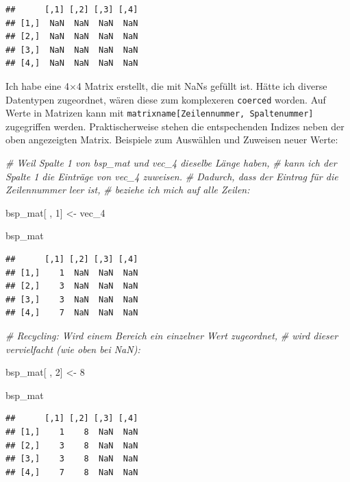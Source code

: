 \documentclass[
  ngerman,
]{book}
\newenvironment{Shaded}{\begin{snugshade}}{\end{snugshade}}
\newcommand{\CommentTok}[1]{\textcolor[rgb]{0.56,0.35,0.01}{\textit{#1}}}
\newcommand{\DecValTok}[1]{\textcolor[rgb]{0.00,0.00,0.81}{#1}}
\newcommand{\NormalTok}[1]{#1}
\newcommand{\OtherTok}[1]{\textcolor[rgb]{0.56,0.35,0.01}{#1}}
\begin{document}
\begin{verbatim}
##      [,1] [,2] [,3] [,4]
## [1,]  NaN  NaN  NaN  NaN
## [2,]  NaN  NaN  NaN  NaN
## [3,]  NaN  NaN  NaN  NaN
## [4,]  NaN  NaN  NaN  NaN
\end{verbatim}

Ich habe eine 4×4 Matrix erstellt, die mit NaNs gefüllt ist. Hätte ich diverse Datentypen zugeordnet, wären diese zum komplexeren \texttt{coerced} worden. Auf Werte in Matrizen kann mit \texttt{matrixname{[}Zeilennummer,\ Spaltenummer{]}} zugegriffen werden. Praktischerweise stehen die entspechenden Indizes neben der oben angezeigten Matrix. Beispiele zum Auswählen und Zuweisen neuer Werte:

\begin{Shaded}
\begin{Highlighting}[]
\CommentTok{\# Weil Spalte 1 von bsp\_mat und vec\_4 dieselbe Länge haben,}
\CommentTok{\# kann ich der Spalte 1 die Einträge von vec\_4 zuweisen.}
\CommentTok{\# Dadurch, dass der Eintrag für die Zeilennummer leer ist, }
\CommentTok{\# beziehe ich mich auf alle Zeilen:}

\NormalTok{bsp\_mat[ , }\DecValTok{1}\NormalTok{] }\OtherTok{\textless{}{-}}\NormalTok{ vec\_4}

\NormalTok{bsp\_mat}
\end{Highlighting}
\end{Shaded}

\begin{verbatim}
##      [,1] [,2] [,3] [,4]
## [1,]    1  NaN  NaN  NaN
## [2,]    3  NaN  NaN  NaN
## [3,]    3  NaN  NaN  NaN
## [4,]    7  NaN  NaN  NaN
\end{verbatim}

\begin{Shaded}
\begin{Highlighting}[]
\CommentTok{\# Recycling: Wird einem Bereich ein einzelner Wert zugeordnet,}
\CommentTok{\# wird dieser vervielfacht (wie oben bei NaN):}

\NormalTok{bsp\_mat[ , }\DecValTok{2}\NormalTok{] }\OtherTok{\textless{}{-}} \DecValTok{8}

\NormalTok{bsp\_mat}
\end{Highlighting}
\end{Shaded}

\begin{verbatim}
##      [,1] [,2] [,3] [,4]
## [1,]    1    8  NaN  NaN
## [2,]    3    8  NaN  NaN
## [3,]    3    8  NaN  NaN
## [4,]    7    8  NaN  NaN
\end{verbatim}
\end{document}
